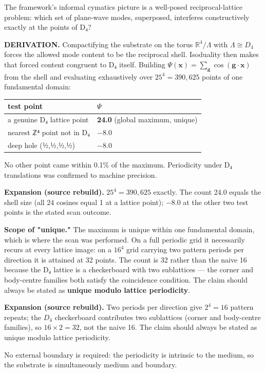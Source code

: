 \documentclass[a4paper,11pt]{article}
\newcommand{\expansion}[1]{\par\smallskip\noindent\textbf{Expansion (source rebuild).} #1\par\smallskip}
\begin{document}
The framework's informal cymatics picture is a well-posed reciprocal-lattice problem: which set of plane-wave modes, superposed, interferes constructively exactly at the points of D₄?

\textbf{DERIVATION.} Compactifying the substrate on the torus $\mathbb{R}^4/\Lambda$ with $\Lambda\cong D_4$ forces the allowed mode content to be the reciprocal shell. Isoduality then makes that forced content congruent to D₄ itself. Building $\Psi(\mathbf{x})=\sum_{\mathbf{g}}\cos(\mathbf{g}\cdot\mathbf{x})$ from the shell and evaluating exhaustively over $25^4=390{,}625$ points of one fundamental domain:

\begin{center}
\begin{tabular}{ll}
\hline
test point & $\Psi$ \\
\hline
a genuine D₄ lattice point & \textbf{24.0} (global maximum, unique) \\
nearest ℤ⁴ point not in D₄ & $-$8.0 \\
deep hole (½,½,½,½) & $-$8.0 \\
\hline
\end{tabular}
\end{center}

No other point came within 0.1\% of the maximum. Periodicity under D₄ translations was confirmed to machine precision.


\expansion{$25^4 = 390{,}625$ exactly. The count 24.0 equals the shell size (all 24 cosines equal 1 at a lattice point); $-8.0$ at the other two test points is the stated scan outcome.}
\textbf{Scope of "unique."} The maximum is unique within one fundamental domain, which is where the scan was performed. On a full periodic grid it necessarily recurs at every lattice image: on a $16^4$ grid carrying two pattern periods per direction it is attained at 32 points. The count is 32 rather than the naive 16 because the D₄ lattice is a checkerboard with two sublattices — the corner and body-centre families both satisfy the coincidence condition. The claim should always be stated as \textbf{unique modulo lattice periodicity}.


\expansion{Two periods per direction give $2^4 = 16$ pattern repeats; the $D_4$ checkerboard contributes two sublattices (corner and body-centre families), so $16 \times 2 = 32$, not the naive 16. The claim should always be stated as unique modulo lattice periodicity.}
No external boundary is required: the periodicity is intrinsic to the medium, so the substrate is simultaneously medium and boundary.
\end{document}
